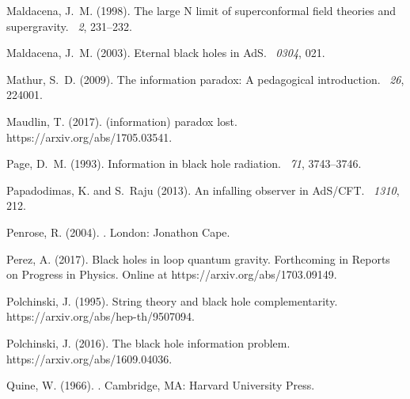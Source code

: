 \documentclass{article}
\begin{document}
\begin{thebibliography}{}
Maldacena, J.~M. (1998).
\newblock The large {N} limit of superconformal field theories and
  supergravity.
~{\em 2},
  231--232.

Maldacena, J.~M. (2003).
\newblock Eternal black holes in {A}d{S}.
~{\em 0304}, 021.

Mathur, S.~D. (2009).
\newblock The information paradox: A pedagogical introduction.
~{\em 26}, 224001.

Maudlin, T. (2017).
\newblock (information) paradox lost.
\newblock https://arxiv.org/abs/1705.03541.

Page, D.~M. (1993).
\newblock Information in black hole radiation.
~{\em 71}, 3743--3746.

Papadodimas, K. and S.~Raju (2013).
\newblock An infalling observer in {A}d{S}/{CFT}.
~{\em 1310}, 212.

Penrose, R. (2004).
.
\newblock London: Jonathon Cape.

Perez, A. (2017).
\newblock Black holes in loop quantum gravity.
\newblock Forthcoming in Reports on Progress in Physics. Online at
  https://arxiv.org/abs/1703.09149.

Polchinski, J. (1995).
\newblock String theory and black hole complementarity.
\newblock https://arxiv.org/abs/hep-th/9507094.

Polchinski, J. (2016).
\newblock The black hole information problem.
\newblock https://arxiv.org/abs/1609.04036.

Quine, W. (1966).
.
\newblock Cambridge, MA: Harvard University Press.


\end{thebibliography}
\end{document}

